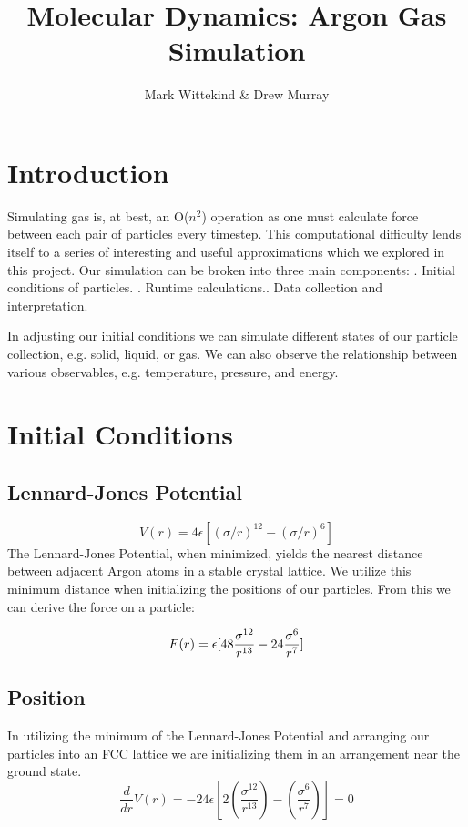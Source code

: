 \documentclass[10pt]{article}
\title{Molecular Dynamics: Argon Gas Simulation}
\author{Mark Wittekind \& Drew Murray}
\newcommand{\beq}{\begin{equation}}
\newcommand{\eeq}{\end{equation}}
\begin{document}
\maketitle
\section{Introduction}
Simulating gas is, at best, an O($n^2$) operation as one must calculate force between each pair of particles every timestep.  This computational difficulty lends itself to a series of interesting and useful approximations which we explored in this project.  Our simulation can be broken into three main components:
\newline
{}. Initial conditions of particles. . Runtime calculations.. Data collection and interpretation.\newline

	
In adjusting our initial conditions we can simulate different states of our particle collection, e.g. solid, liquid, or gas.  We can also observe the relationship between various observables, e.g. temperature, pressure, and energy.

\section{Initial Conditions}
\subsection{Lennard-Jones Potential}
\beq
\label{eqn:equation1}
 V(r) = 4\epsilon[(\sigma / r)^{12} -(\sigma / r)^6]
\eeq
The Lennard-Jones Potential, when minimized, yields the nearest distance between adjacent Argon atoms in a stable crystal lattice.  We utilize this minimum distance when initializing the positions of our particles.  From this we can derive the force on a particle:

\beq
\label{eqn:equation2}
F(r) = \epsilon[48{ \sigma ^{12} \over r^{13}} - 24{\sigma ^{6} \over r^{7}} ]
\eeq

\subsection{Position}
In utilizing the minimum of the Lennard-Jones Potential and arranging our particles into an FCC lattice we are initializing them in an arrangement near the ground state.
\newline
\newline
\beq
\label{eqn:equation3}
\frac{d}{dr}V(r) = -24\epsilon[2(\frac{\sigma^{12}}{r^{13}})-(\frac{\sigma^{6}}{r^{7}})] = 0
\eeq
\newline
\end{document}
